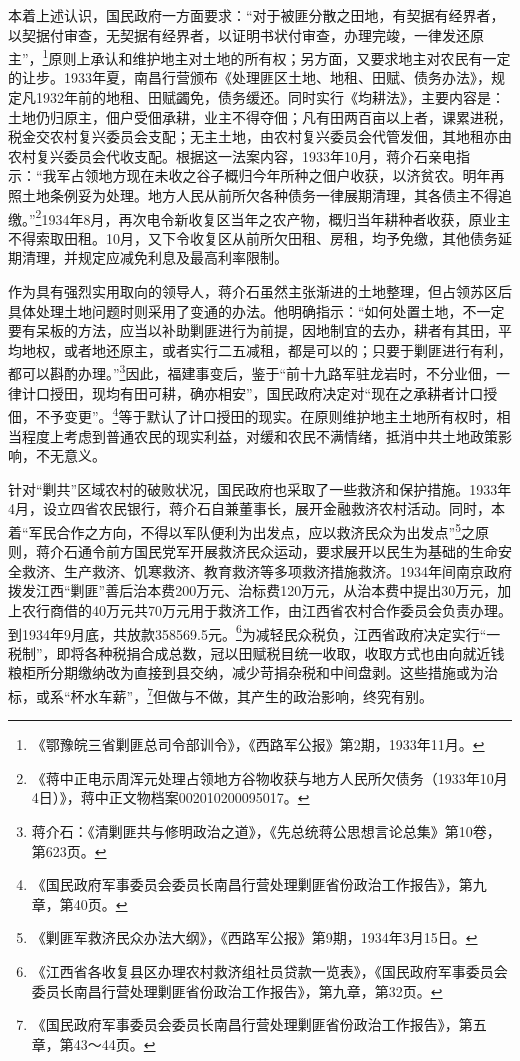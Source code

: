 本着上述认识，国民政府一方面要求：“对于被匪分散之田地，有契据有经界者，以契据付审查，无契据有经界者，以证明书状付审查，办理完竣，一律发还原主”，\footnote{《鄂豫皖三省剿匪总司令部训令》，《西路军公报》第2期，1933年11月。}原则上承认和维护地主对土地的所有权；另方面，又要求地主对农民有一定的让步。1933年夏，南昌行营颁布《处理匪区土地、地租、田赋、债务办法》，规定凡1932年前的地租、田赋蠲免，债务缓还。同时实行《均耕法》，主要内容是：土地仍归原主，佃户受佃承耕，业主不得夺佃；凡有田两百亩以上者，课累进税，税金交农村复兴委员会支配；无主土地，由农村复兴委员会代管发佃，其地租亦由农村复兴委员会代收支配。根据这一法案内容，1933年10月，蒋介石亲电指示：“我军占领地方现在未收之谷子概归今年所种之佃户收获，以济贫农。明年再照土地条例妥为处理。地方人民从前所欠各种债务一律展期清理，其各债主不得追缴。”\footnote{《蒋中正电示周浑元处理占领地方谷物收获与地方人民所欠债务（1933年10月4日）》，蒋中正文物档案002010200095017。}1934年8月，再次电令新收复区当年之农产物，概归当年耕种者收获，原业主不得索取田租。10月，又下令收复区从前所欠田租、房租，均予免缴，其他债务延期清理，并规定应减免利息及最高利率限制。


作为具有强烈实用取向的领导人，蒋介石虽然主张渐进的土地整理，但占领苏区后具体处理土地问题时则采用了变通的办法。他明确指示：“如何处置土地，不一定要有呆板的方法，应当以补助剿匪进行为前提，因地制宜的去办，耕者有其田，平均地权，或者地还原主，或者实行二五减租，都是可以的；只要于剿匪进行有利，都可以斟酌办理。”\footnote{蒋介石：《清剿匪共与修明政治之道》，《先总统蒋公思想言论总集》第10卷，第623页。}因此，福建事变后，鉴于“前十九路军驻龙岩时，不分业佃，一律计口授田，现均有田可耕，确亦相安”，国民政府决定对“现在之承耕者计口授佃，不予变更”。\footnote{《国民政府军事委员会委员长南昌行营处理剿匪省份政治工作报告》，第九章，第40页。}等于默认了计口授田的现实。在原则维护地主土地所有权时，相当程度上考虑到普通农民的现实利益，对缓和农民不满情绪，抵消中共土地政策影响，不无意义。


针对“剿共”区域农村的破败状况，国民政府也采取了一些救济和保护措施。1933年4月，设立四省农民银行，蒋介石自兼董事长，展开金融救济农村活动。同时，本着“军民合作之方向，不得以军队便利为出发点，应以救济民众为出发点”\footnote{《剿匪军救济民众办法大纲》，《西路军公报》第9期，1934年3月15日。}之原则，蒋介石通令前方国民党军开展救济民众运动，要求展开以民生为基础的生命安全救济、生产救济、饥寒救济、教育救济等多项救济措施救济。1934年间南京政府拨发江西“剿匪”善后治本费200万元、治标费120万元，从治本费中提出30万元，加上农行商借的40万元共70万元用于救济工作，由江西省农村合作委员会负责办理。到1934年9月底，共放款358569.5元。\footnote{《江西省各收复县区办理农村救济组社员贷款一览表》，《国民政府军事委员会委员长南昌行营处理剿匪省份政治工作报告》，第九章，第32页。}为减轻民众税负，江西省政府决定实行“一税制”，即将各种税捐合成总数，冠以田赋税目统一收取，收取方式也由向就近钱粮柜所分期缴纳改为直接到县交纳，减少苛捐杂税和中间盘剥。这些措施或为治标，或系“杯水车薪”，\footnote{《国民政府军事委员会委员长南昌行营处理剿匪省份政治工作报告》，第五章，第43～44页。}但做与不做，其产生的政治影响，终究有别。



